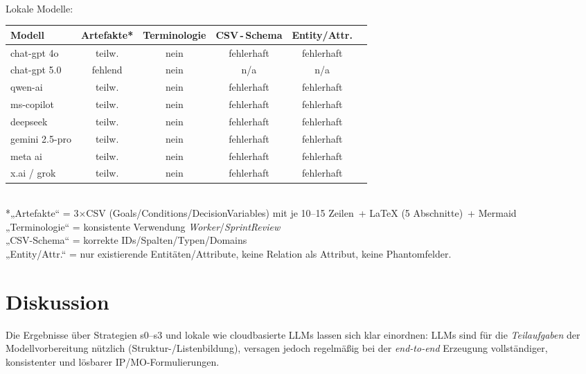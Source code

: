 \documentclass[runningheads]{llncs}
\begin{document}
\paragraph{ }

Lokale Modelle: \\
\begin{tabular}{@{} l c c c c p{7.8cm} @{}}
\toprule
\textbf{Modell} & \textbf{Artefakte*} & \textbf{Terminologie} & \textbf{CSV\,-\,Schema} & \textbf{Entity/Attr.} \\
\midrule
chat-gpt 4o & teilw. & nein & fehlerhaft & fehlerhaft \\
chat-gpt 5.0 & fehlend & nein & n/a & n/a \\
qwen-ai & teilw. & nein & fehlerhaft & fehlerhaft \\
ms-copilot & teilw. & nein & fehlerhaft & fehlerhaft \\
deepseek & teilw. & nein & fehlerhaft & fehlerhaft \\
gemini 2.5-pro & teilw. & nein & fehlerhaft & fehlerhaft \\
meta ai & teilw. & nein & fehlerhaft & fehlerhaft \\
x.ai / grok & teilw. & nein & fehlerhaft & fehlerhaft \\
\bottomrule
\end{tabular}
\\
*„Artefakte“ = 3$\times$CSV (Goals/Conditions/DecisionVariables) mit je 10–15 Zeilen \,+ LaTeX (5 Abschnitte) \,+ Mermaid \\
„Terminologie“ = konsistente Verwendung \emph{Worker}/\emph{SprintReview} \\
„CSV-Schema“ = korrekte IDs/Spalten/Typen/Domains \\
„Entity/Attr.“ = nur existierende Entitäten/Attribute, keine Relation als Attribut, keine Phantomfelder.


\section{Diskussion}

Die Ergebnisse über Strategien s0--s3 und lokale wie cloudbasierte LLMs lassen sich klar einordnen: LLMs sind für die \emph{Teilaufgaben} der Modellvorbereitung nützlich (Struktur-/Listenbildung), versagen jedoch regelmäßig bei der \emph{end-to-end} Erzeugung vollständiger, konsistenter und lösbarer IP/MO-Formulierungen.
\end{document}
